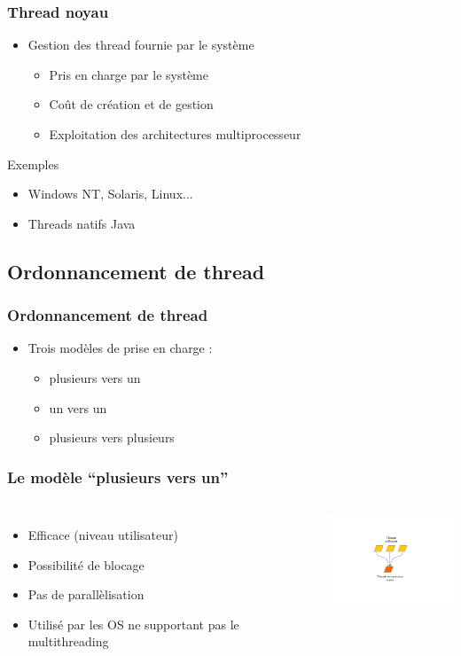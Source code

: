 \begin{frame}
 \frametitle{Thread noyau}
 \begin{itemize}
 \item Gestion des thread fournie par le système
 \begin{itemize}
 \item Pris en charge par le système
 \item Coût de création et de gestion
 \item Exploitation des architectures multiprocesseur
 \end{itemize}
 \end{itemize}
 \begin{exampleblock}{Exemples}
 \begin{itemize}
 \item Windows NT, Solaris, Linux...
 \item Threads natifs Java
 \end{itemize}
 \end{exampleblock}
\end{frame}

\subsection{Ordonnancement de thread}

\begin{frame}
 \frametitle{Ordonnancement de thread}
 \begin{itemize}
 \item Trois modèles de prise en charge :
 \begin{itemize}
 \item plusieurs vers un
 \item un vers un
 \item plusieurs vers plusieurs
 \end{itemize}
 \end{itemize}
\end{frame}


\begin{frame}
 \frametitle{Le modèle ``plusieurs vers un''}
 \begin{columns}
 \begin{itemize}
 \item Efficace (niveau utilisateur)
 \item Possibilité de blocage
 \item Pas de parallèlisation
 \item Utilisé par les OS ne supportant pas le multithreading
 \end{itemize}
 \includegraphics[width=4cm]{../illustration/threads-plusieurs-1.pdf}
 \end{columns}
\end{frame}



